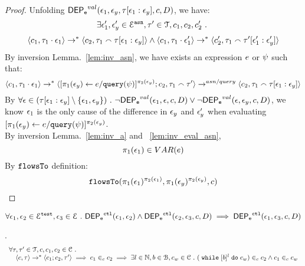 \begin{proof}

Unfolding $\mathsf{DEP_{\mathtt{e}}}^{val}(\mathtt{\epsilon}_1, \mathtt{\epsilon}_y, \mathtt{\tau}[\mathtt{\epsilon}_1:\mathtt{\epsilon}_y], c, D)$, we have:
\[
  \exists \mathtt{\epsilon}_1', \mathtt{\epsilon}_y' \in \mathcal{E}^{\mathtt{{asn}}},
  \mathtt{\tau}' \in \mathcal{T}, c_1, c_2, c_2' ~.~
\]
%
\[
\langle c_1, \mathtt{\tau}_1 \cdot \mathtt{\epsilon}_1 \rangle \rightarrow^{*} \langle c_2, \mathtt{\tau}_1 \smallfrown \mathtt{\tau}[\mathtt{\epsilon}_1:\mathtt{\epsilon}_y] \rangle 
\land
\langle c_1, \mathtt{\tau}_1 \cdot \mathtt{\epsilon}_1' \rangle \rightarrow^{*} \langle c_2', \mathtt{\tau}_1 \smallfrown \mathtt{\tau}'[\mathtt{\epsilon}_1':\mathtt{\epsilon}_y'] \rangle 
\]
%
%
By inversion Lemma.~\ref{lem:inv_asn}, we have exists an expression $e$ or $\psi$ such that:
\[
\langle c_1, \mathtt{\tau}_1 \cdot \mathtt{\epsilon}_1 \rangle \rightarrow^{*} \langle [\mathrel{ \pi_1(\mathtt{\epsilon}_y) \leftarrow e / {\tt query}(\psi) }]{}^{\pi_2(\mathtt{\epsilon}_y)};c_2, \mathtt{\tau}_1 \smallfrown \mathtt{\tau}' \rangle \rightarrow^{asn / query} \langle c_2, \mathtt{\tau}_1 \smallfrown \mathtt{\tau}[\mathtt{\epsilon}_1:\mathtt{\epsilon}_y] \rangle 
\]
%
By $\forall \mathtt{\epsilon} \in (\mathtt{\tau}[\mathtt{\epsilon}_1:\mathtt{\epsilon}_y]\setminus \{\mathtt{\epsilon}_1, \mathtt{\epsilon}_y\}) ~.~
  \neg \mathsf{DEP_{\mathtt{e}}}^{val} (\mathtt{\epsilon}_1, \mathtt{\epsilon}, c, D) \lor \neg \mathsf{DEP_{\mathtt{e}}}^{val} (\mathtt{\epsilon}, \mathtt{\epsilon}_y, c, D)$,
we know $\mathtt{\epsilon}_1$ is the only cause of the difference in $\mathtt{\epsilon}_y$ and $\mathtt{\epsilon}_y'$ when evaluating $[\mathrel{ \pi_1(\mathtt{\epsilon}_y) \leftarrow e / {\tt query}(\psi) }]{}^{\pi_2(\mathtt{\epsilon}_y)}$.
%
\\
By inversion Lemma.~\ref{lem:inv_a} and ~\ref{lem:inv_eval_asn}, 
\[
  \pi_1(\mathtt{\epsilon}_1) \in VAR(e)
\]
%
By $\mathtt{flowsTo}$ definition:
\[
  \mathtt{flowsTo}(\pi_1(\mathtt{\epsilon}_1)^{\pi_2(\mathtt{\epsilon}_1)}, \pi_1(\mathtt{\epsilon}_y)^{\pi_2(\mathtt{\epsilon}_y)}, c)
\]
\end{proof}
\begin{lem}
\label{lem:ctl_trans}
\[
  \forall \mathtt{\epsilon}_1, \mathtt{\epsilon}_2 \in \mathcal{E}^{\mathtt{{test}}}, \mathtt{\epsilon}_3 \in \mathcal{E} ~.~
  \mathsf{DEP_{\mathtt{e}}}^{\mathtt{{ctl}}}(\mathtt{\epsilon}_1, \mathtt{\epsilon}_2) 
  \land \mathsf{DEP_{\mathtt{e}}}^{\mathtt{{ctl}}}(\mathtt{\epsilon}_2, \mathtt{\epsilon}_3, c, D)
  \implies \mathsf{DEP_{\mathtt{e}}}^{\mathtt{{ctl}}}(\mathtt{\epsilon}_1, \mathtt{\epsilon}_3, c, D)
\]
\end{lem}
%
\begin{lem}.
\label{lem:inv_while}
\[
\begin{array}{l}
\forall \mathtt{\tau}, \mathtt{\tau}' \in \mathcal{T}, c, c_1, c_2 \in \mathcal{C} ~.~
	\\ \quad
	\langle c, \mathtt{\tau} \rangle \rightarrow^* \langle c_1; c_2, \mathtt{\tau}' \rangle
	\implies
	c_1 \in_c c_2
	\implies
	\exists l \in \mathbb{N}, b \in \mathcal{B}, c_w \in \mathcal{C} ~.~ 
	(\;\mathtt{while}\; [b]^l \;\mathtt{do}\; c_w) \in_c c_2 \land c_1 \in_c c_w
\end{array}
\]
\end{lem}
%

